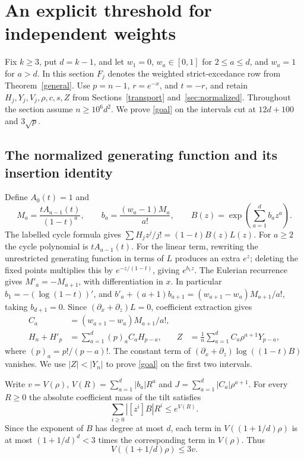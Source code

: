 \section{An explicit threshold for independent weights}\label{sec:general}
Fix \(k\ge3\), put \(d=k-1\), and let \(w_1=0\), \(w_a\in[0,1]\) for
\(2\le a\le d\), and \(w_a=1\) for \(a>d\).
In this section \(F_j\) denotes the weighted strict-excedance row from
Theorem~\ref{general}. Use \(p=n-1\), \(r=e^{-x}\), and \(t=-r\), and retain
\(H_j,Y_j,V_j,\rho,c,s,Z\) from Sections~\ref{transport} and~\ref{sec:normalized}.
Throughout the section assume \(n\ge10^6d^2\). We prove \eqref{goal}
on the intervals cut at \(12d+100\) and \(3\sqrt p\).

\subsection{The normalized generating function and its insertion identity}
Define \(A_0(t)=1\) and
\[
 M_a=\frac{t A_{a-1}(t)}{(1-t)^a},\qquad
 b_a=\frac{(w_a-1)M_a}{a!},\qquad
 B(z)=\exp\!\left(\sum_{a=1}^{d} b_a z^a\right).
\]
The labelled cycle formula gives \(\sum H_j z^j/j!=(1-t)B(z)L(z)\).
For \(a\ge2\) the cycle polynomial is \(t A_{a-1}(t)\). For the linear
term, rewriting the unrestricted generating function in terms of \(L\)
produces an extra \(e^z\); deleting the fixed points multiplies this by
\(e^{-z/(1-t)}\), giving \(e^{b_1z}\).
The Eulerian recurrence gives \(M'_a=-M_{a+1}\), with differentiation
in \(x\). In particular \(b_1=-(\log(1-t))'\), and
\(b'_a+(a+1)b_{a+1}=(w_{a+1}-w_a)M_{a+1}/a!\), taking \(b_{d+1}=0\).
Since \((\partial_x+\partial_z)L=0\), coefficient extraction gives
\begin{align}
 C_a&=(w_{a+1}-w_a)M_{a+1}/a!,\nonumber\\
 H_n+H'_p&=\sum_{a=1}^{d}(p)_a C_a H_{p-a},
 &Z&=\frac1n\sum_{a=1}^{d} C_a\rho^{a+1}Y_{p-a},\label{general-insertion}
\end{align}
where \((p)_a=p!/(p-a)!\). The constant term of
\((\partial_x+\partial_z)\log((1-t)B)\) vanishes.
We use \(|Z|<|Y_n|\) to prove \eqref{goal} on the first two intervals.

Write \(v=V(\rho)\), \(V(R)=\sum_{a=1}^d |b_a|R^a\) and
\(J=\sum_{a=1}^d |C_a|\rho^{a+1}\). For every \(R\ge0\) the absolute
coefficient mass of the tilt satisfies
\[
 \sum_{i\ge0}|[z^i]B|R^i\le e^{V(R)} .
\]
Since the exponent of \(B\) has degree at most \(d\), each term in
\(V((1+1/d)\rho)\) is at most \((1+1/d)^d<3\) times the
corresponding term in \(V(\rho)\). Thus
\begin{equation}\label{quadratic-dilation}
 V((1+1/d)\rho)\le 3v .
\end{equation}

